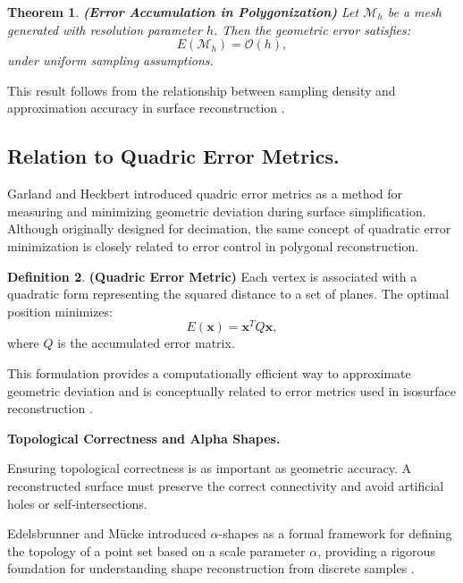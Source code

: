 \documentclass[12pt, a4paper, oneside]{book}
\theoremstyle{plain}
\newtheorem{theorem}{Theorem}[chapter]
\theoremstyle{definition}
\newtheorem{definition}[theorem]{Definition}
\theoremstyle{remark}
\theoremstyle{definition}
\begin{document}
\begin{theorem}
    \textbf{(Error Accumulation in Polygonization)}
Let $\mathcal{M}_h$ be a mesh generated with resolution parameter $h$. Then the geometric error satisfies:
\[
E(\mathcal{M}_h) = \mathcal{O}(h),
\]
under uniform sampling assumptions.
\end{theorem}



This result follows from the relationship between sampling density and approximation accuracy in surface reconstruction \cite{cignoni1998metro}.

\vspace{0.5em}

\subsection{Relation to Quadric Error Metrics.}

Garland and Heckbert introduced quadric error metrics as a method for measuring and minimizing geometric deviation during surface simplification. Although originally designed for decimation, the same concept of quadratic error minimization is closely related to error control in polygonal reconstruction.
\begin{definition}
    \textbf{(Quadric Error Metric)}
Each vertex is associated with a quadratic form representing the squared distance to a set of planes. The optimal position minimizes:
\[
E(\mathbf{x}) = \mathbf{x}^T Q \mathbf{x},
\]
where $Q$ is the accumulated error matrix.
\end{definition}


This formulation provides a computationally efficient way to approximate geometric deviation and is conceptually related to error metrics used in isosurface reconstruction \cite{garland1997surface}.

\vspace{0.5em}

\textbf{Topological Correctness and Alpha Shapes.}

Ensuring topological correctness is as important as geometric accuracy. A reconstructed surface must preserve the correct connectivity and avoid artificial holes or self-intersections.

Edelsbrunner and Mücke introduced $\alpha$-shapes as a formal framework for defining the topology of a point set based on a scale parameter $\alpha$, providing a rigorous foundation for understanding shape reconstruction from discrete samples \cite{edelsbrunner1994three}.
\end{document}
